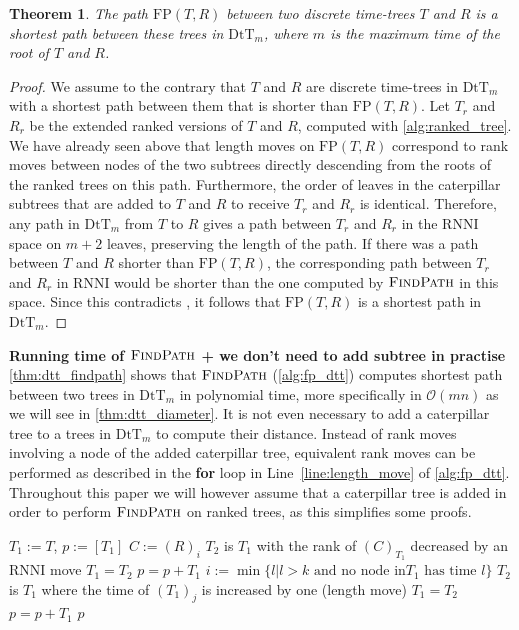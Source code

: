 \documentclass[11pt]{amsart}
\newtheorem{theorem}{Theorem}
\newcommand{\rnni}{\mathrm{RNNI}}
\newcommand{\findpath}{\textsc{FindPath}}
\newcommand{\rank}{\mathrm{rank}}
\newcommand{\fp}{\mathrm{FP}}
\newcommand{\dtt}{\mathrm{DtT}}
\renewcommand{\O}{\mathcal O}
\newcommand{\summary}[1]{\textbf{#1}} %
\begin{document}
\begin{theorem}
	The path $\fp(T,R)$ between two discrete time-trees $T$ and $R$ is a shortest path between these trees in $\dtt_m$, where $m$ is the maximum time of the root of $T$ and $R$.
	\label{thm:dtt_findpath}
\end{theorem}

\begin{proof}
	We assume to the contrary that $T$ and $R$ are discrete time-trees in $\dtt_m$ with a shortest path between them that is shorter than $\fp(T,R)$.
	Let $T_r$ and $R_r$ be the extended ranked versions of $T$ and $R$, computed with \autoref{alg:ranked_tree}.
	We have already seen above that length moves on $\fp(T,R)$ correspond to rank moves between nodes of the two subtrees directly descending from the roots of the ranked trees on this path.
	Furthermore, the order of leaves in the caterpillar subtrees that are added to $T$ and $R$ to receive $T_r$ and $R_r$ is identical.
	Therefore, any path in $\dtt_m$ from $T$ to $R$ gives a path between $T_r$ and $R_r$ in the $\rnni$ space on $m+2$ leaves, preserving the length of the path.
	If there was a path between $T$ and $R$ shorter than $\fp(T,R)$, the corresponding path between $T_r$ and $R_r$ in $\rnni$ would be shorter than the one computed by $\findpath$ in this space.
	Since this contradicts \autocite[Theorem 1]{Collienne2020-iu}, it follows that $\fp(T,R)$ is a shortest path in $\dtt_m$.
\end{proof}

\summary{Running time of $\findpath$ + we don't need to add subtree in practise}
\autoref{thm:dtt_findpath} shows that $\findpath$ (\autoref{alg:fp_dtt}) computes shortest path between two trees in $\dtt_m$ in polynomial time, more specifically in $\O(mn)$ as we will see in \autoref{thm:dtt_diameter}.
It is not even necessary to add a caterpillar tree to a trees in $\dtt_m$ to compute their distance.
Instead of rank moves involving a node of the added caterpillar tree, equivalent rank moves can be performed as described in the \textbf{for} loop in Line~\ref{line:length_move} of \autoref{alg:fp_dtt}.
Throughout this paper we will however assume that a caterpillar tree is added in order to perform $\findpath$ on ranked trees, as this simplifies some proofs.

\begin{algorithm}[h]
	\caption{$\findpath$($T,R$)}
	\begin{algorithmic}[1]
		\label{alg:fp_dtt}
		\STATE $T_1 := T$, $p := [T_1]$
			\STATE $C:=(R)_i$
			\WHILE {$\rank((C)_{T_1})>k$}
					\STATE $T_2$ is $T_1$ with the rank of $(C)_{T_1}$ decreased by an $\rnni$ move
				\STATE $T_1 = T_2$
				\STATE $p = p+T_1$
			\ENDWHILE
			\ELSE
				\STATE $i := \min\{l | l>k \text{ and no node in} T_1 \text{ has time }l\}$
					\label{line:length_move}
					\STATE $T_2$ is $T_1$ where the time of $(T_1)_j$ is increased by one (length move)
					\STATE $T_1 = T_2$
					\STATE $p = p+T_1$
				\ENDFOR
			\ENDIF
		\ENDFOR
		\RETURN $p$
	\end{algorithmic}
\end{algorithm}
\end{document}

